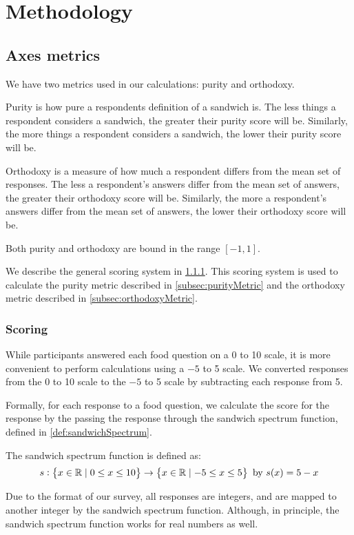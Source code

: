 \chapter{Methodology}

\section{Axes metrics}
We have two metrics used in our calculations: purity and orthodoxy.

Purity is how pure a respondents definition of a sandwich is.
The less things a respondent considers a sandwich, the greater their purity score will be.
Similarly, the more things a respondent considers a sandwich, the lower their purity score will be.

Orthodoxy is a measure of how much a respondent differs from the mean set of responses.
The less a respondent's answers differ from the mean set of answers, the greater their orthodoxy score will be.
Similarly, the more a respondent's answers differ from the mean set of answers, the lower their orthodoxy score will be.

Both purity and orthodoxy are bound in the range $[-1, 1]$.

We describe the general scoring system in \cref{subsec:scoring}.
This scoring system is used to calculate the purity metric described in \cref{subsec:purityMetric} and the orthodoxy metric described in \cref{subsec:orthodoxyMetric}.

\subsection{Scoring}\label{subsec:scoring}
While participants answered each food question on a 0 to 10 scale, it is more convenient to perform calculations using a $-5$ to 5 scale.
We converted responses from the 0 to 10 scale to the $-5$ to 5 scale by subtracting each response from 5.

Formally, for each response to a food question, we calculate the score for the response by the passing the response through the sandwich spectrum function, defined in \cref{def:sandwichSpectrum}.

\begin{definition}\label{def:sandwichSpectrum}
	The sandwich spectrum function is defined as:
	\begin{equation}
		s : \set{x \in \mathbb{R}\mid0 \leq x \leq 10} \to \set{x \in \mathbb{R}\mid-5 \leq x \leq 5}\ \text{by}\ s(x) = 5 - x
	\end{equation}
\end{definition}
Due to the format of our survey, all responses are integers, and are mapped to another integer by the sandwich spectrum function.
Although, in principle, the sandwich spectrum function works for real numbers as well.

